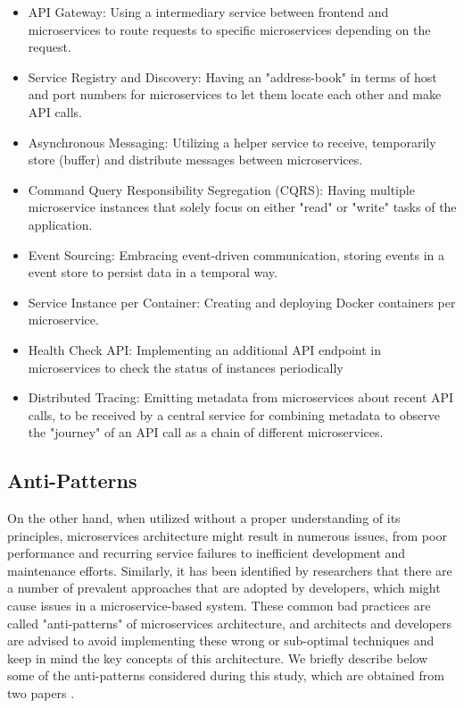 \documentclass[11pt,a4paper,twocolumn]{article}
\begin{document}
\begin{itemize}
    \item API Gateway: Using a intermediary service between frontend and microservices to route requests to specific microservices depending on the request.
    \item Service Registry and Discovery: Having an "address-book" in terms of host and port numbers for microservices to let them locate each other and make API calls.
    \item Asynchronous Messaging: Utilizing a helper service to receive, temporarily store (buffer) and distribute messages between microservices.
    \item Command Query Responsibility Segregation (CQRS): Having multiple microservice instances that solely focus on either "read" or "write" tasks of the application.
    \item Event Sourcing: Embracing event-driven communication, storing events in a event store to persist data in a temporal way.
    \item Service Instance per Container: Creating and deploying Docker containers per microservice.
    \item Health Check API: Implementing an additional API endpoint in microservices to check the status of instances periodically
    \item Distributed Tracing: Emitting metadata from microservices about recent API calls, to be received by a central service for combining metadata to observe the "journey" of an API call as a chain of different microservices.
\end{itemize}

\subsection{Anti-Patterns}
\label{subsec:anti-patterns}

On the other hand, when utilized without a proper understanding of its principles, microservices architecture might result in numerous issues, from poor performance and recurring service failures to inefficient development and maintenance efforts.
Similarly, it has been identified by researchers that there are a number of prevalent approaches that are adopted by developers, which might cause issues in a microservice-based system.
These common bad practices are called "anti-patterns" of microservices architecture, and architects and developers are advised to avoid implementing these wrong or sub-optimal techniques and keep in mind the key concepts of this architecture.
We briefly describe below some of the anti-patterns considered during this study, which are obtained from two papers \cite{9522227}\cite{10.1145/3424771.3424812}.\\
\end{document}
